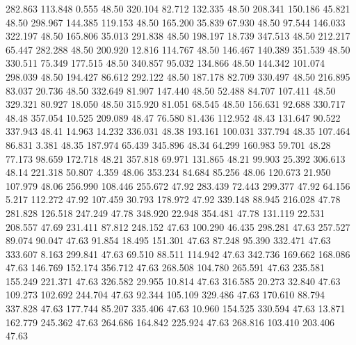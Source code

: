  282.863  113.848    0.555        48.50
 320.104   82.712  132.335        48.50
 208.341  150.186   45.821        48.50
 298.967  144.385  119.153        48.50
 165.200   35.839   67.930        48.50
  97.544  146.033  322.197        48.50
 165.806   35.013  291.838        48.50
 198.197   18.739  347.513        48.50
 212.217   65.447  282.288        48.50
 200.920   12.816  114.767        48.50
 146.467  140.389  351.539        48.50
 330.511   75.349  177.515        48.50
 340.857   95.032  134.866        48.50
 144.342  101.074  298.039        48.50
 194.427   86.612  292.122        48.50
 187.178   82.709  330.497        48.50
 216.895   83.037   20.736        48.50
 332.649   81.907  147.440        48.50
  52.488   84.707  107.411        48.50
 329.321   80.927   18.050        48.50
 315.920   81.051   68.545        48.50
 156.631   92.688  330.717        48.48
 357.054   10.525  209.089        48.47
  76.580   81.436  112.952        48.43
 131.647   90.522  337.943        48.41
  14.963   14.232  336.031        48.38
 193.161  100.031  337.794        48.35
 107.464   86.831    3.381        48.35
 187.974   65.439  345.896        48.34
  64.299  160.983   59.701        48.28
  77.173   98.659  172.718        48.21
 357.818   69.971  131.865        48.21
  99.903   25.392  306.613        48.14
 221.318   50.807    4.359        48.06
 353.234   84.684   85.256        48.06
 120.673   21.950  107.979        48.06
 256.990  108.446  255.672        47.92
 283.439   72.443  299.377        47.92
  64.156    5.217  112.272        47.92
 107.459   30.793  178.972        47.92
 339.148   88.945  216.028        47.78
 281.828  126.518  247.249        47.78
 348.920   22.948  354.481        47.78
 131.119   22.531  208.557        47.69
 231.411   87.812  248.152        47.63
 100.290   46.435  298.281        47.63
 257.527   89.074   90.047        47.63
  91.854   18.495  151.301        47.63
  87.248   95.390  332.471        47.63
 333.607    8.163  299.841        47.63
  69.510   88.511  114.942        47.63
 342.736  169.662  168.086        47.63
 146.769  152.174  356.712        47.63
 268.508  104.780  265.591        47.63
 235.581  155.249  221.371        47.63
 326.582   29.955   10.814        47.63
 316.585   20.273   32.840        47.63
 109.273  102.692  244.704        47.63
  92.344  105.109  329.486        47.63
 170.610   88.794  337.828        47.63
 177.744   85.207  335.406        47.63
  10.960  154.525  330.594        47.63
  13.871  162.779  245.362        47.63
 264.686  164.842  225.924        47.63
 268.816  103.410  203.406        47.63
